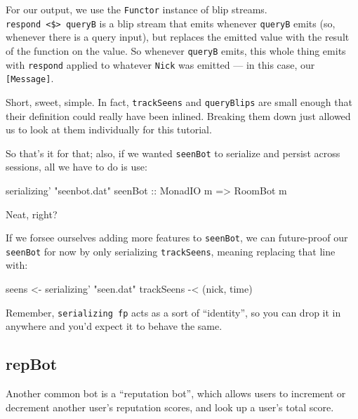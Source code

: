 \documentclass[]{article}
\newenvironment{Shaded}{}{}
\newcommand{\DataTypeTok}[1]{\textcolor[rgb]{0.56,0.13,0.00}{{#1}}}
\newcommand{\StringTok}[1]{\textcolor[rgb]{0.25,0.44,0.63}{{#1}}}
\newcommand{\OtherTok}[1]{\textcolor[rgb]{0.00,0.44,0.13}{{#1}}}
\newcommand{\FunctionTok}[1]{\textcolor[rgb]{0.02,0.16,0.49}{{#1}}}
\newcommand{\NormalTok}[1]{{#1}}
\begin{document}
For our output, we use the \texttt{Functor} instance of blip streams.
\texttt{respond\ \textless{}\$\textgreater{}\ queryB} is a blip stream
that emits whenever \texttt{queryB} emits (so, whenever there is a query
input), but replaces the emitted value with the result of the function
on the value. So whenever \texttt{queryB} emits, this whole thing emits
with \texttt{respond} applied to whatever \texttt{Nick} was emitted ---
in this case, our \texttt{{[}Message{]}}.

Short, sweet, simple. In fact, \texttt{trackSeens} and
\texttt{queryBlips} are small enough that their definition could really
have been inlined. Breaking them down just allowed us to look at them
individually for this tutorial.

So that's it for that; also, if we wanted \texttt{seenBot} to serialize
and persist across sessions, all we have to do is use:

\begin{Shaded}
\begin{Highlighting}[]
\NormalTok{serializing' }\StringTok{"seenbot.dat"}\OtherTok{ seenBot ::} \DataTypeTok{MonadIO} \NormalTok{m }\OtherTok{=>} \DataTypeTok{RoomBot} \NormalTok{m}
\end{Highlighting}
\end{Shaded}

Neat, right?

If we forsee ourselves adding more features to \texttt{seenBot}, we can
future-proof our \texttt{seenBot} for now by only serializing
\texttt{trackSeens}, meaning replacing that line with:

\begin{Shaded}
\begin{Highlighting}[]
    \NormalTok{seens }\OtherTok{<-} \NormalTok{serializing' }\StringTok{"seen.dat"} \NormalTok{trackSeens }\FunctionTok{-<} \NormalTok{(nick, time)}
\end{Highlighting}
\end{Shaded}

Remember, \texttt{serializing\textquotesingle{}\ fp} acts as a sort of
``identity'', so you can drop it in anywhere and you'd expect it to
behave the same.

\subsection{repBot}\label{repbot}

Another common bot is a ``reputation bot'', which allows users to
increment or decrement another user's reputation scores, and look up a
user's total score.
\end{document}
